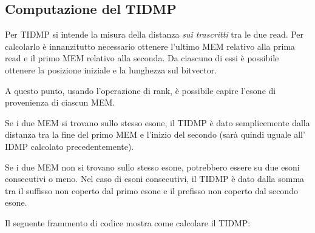 

\subsection{Computazione del TIDMP}
Per TIDMP si intende la misura della distanza \textit{sui trascritti} tra le due read. Per calcolarlo è innanzitutto necessario ottenere l'ultimo MEM relativo alla prima read e il primo MEM relativo alla seconda. Da ciascuno di essi è possibile ottenere la posizione iniziale e la lunghezza sul bitvector. 

A questo punto, usando l'operazione di rank, è possibile capire l'esone di provenienza di ciascun MEM.

Se i due MEM si trovano sullo stesso esone, il TIDMP è dato semplicemente dalla distanza tra la fine del primo MEM e l'inizio del secondo (sarà quindi uguale all' IDMP calcolato precedentemente).

Se i due MEM non si trovano sullo stesso esone, potrebbero essere su due esoni consecutivi o meno. Nel caso di esoni consecutivi, il TIDMP è dato dalla somma tra il suffisso non coperto dal primo esone e il prefisso non coperto dal secondo esone.

Il seguente frammento di codice mostra come calcolare il TIDMP:

